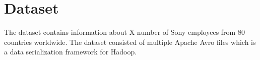 \section{Dataset}
The dataset contains information about X number of Sony employees from 80 countries worldwide.
The dataset consisted of multiple Apache Avro files which is a data serialization framework for Hadoop.